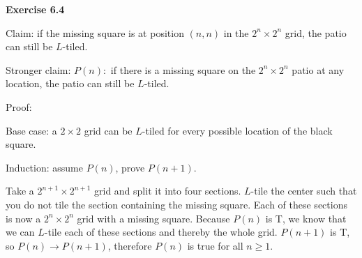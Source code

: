 \documentclass[fleqn]{article}
\begin{document}
\newpage
{\noindent\Large\bf Exercise 6.4}\vspace{1em}\par
Claim: if the missing square is at position $(n,n)$ in the $2^n \times 2^n$ grid, the patio can still be $L$-tiled.\par
Stronger claim: $P(n):$ if there is a missing square on the $2^n \times 2^n$ patio at any location, the patio can still be $L$-tiled.\par
Proof:
\begin{addmargin}{2em}
	Base case: a $2 \times 2$ grid can be $L$-tiled for every possible location of the black square.\par
	Induction: assume $P(n)$, prove $P(n+1)$.\par
	Take a $2^{n+1} \times 2^{n+1}$ grid and split it into four sections. $L$-tile the center such that you do not tile the section containing the missing square. Each of these sections is now a $2^n \times 2^n$ grid with a missing square. Because $P(n)$ is T, we know that we can $L$-tile each of these sections and thereby the whole grid. $P(n+1)$ is T, so $P(n) \rightarrow P(n+1)$, therefore $P(n)$ is true for all $n \geq 1$.
\end{addmargin}
\end{document}
